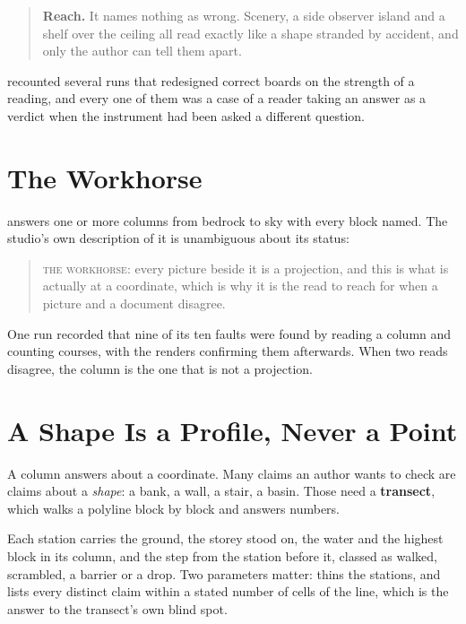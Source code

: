 \begin{quote}
\textbf{Reach.} It names nothing as wrong. Scenery, a side observer island and a
shelf over the ceiling all read exactly like a shape stranded by accident, and only
the author can tell them apart.
\end{quote}

 recounted several runs that redesigned correct boards on the
strength of a reading, and every one of them was a case of a reader taking an answer
as a verdict when the instrument had been asked a different question.

\section{The Workhorse}

 answers one or more columns from bedrock to sky
with every block named. The studio's own description of it is unambiguous about its
status:

\begin{quote}
\textsc{the workhorse}: every picture beside it is a projection, and this is what is
actually at a coordinate, which is why it is the read to reach for when a picture
and a document disagree.
\end{quote}

One run recorded that nine of its ten faults were found by reading a column and
counting courses, with the renders confirming them afterwards. When two reads
disagree, the column is the one that is not a projection.

\section{A Shape Is a Profile, Never a Point}

A column answers about a coordinate. Many claims an author wants to check are
claims about a \emph{shape}: a bank, a wall, a stair, a basin. Those need a
\textbf{transect}, which walks a polyline block by block and answers numbers.

Each station carries the ground, the storey stood on, the water and the highest
block in its column, and the step from the station before it, classed as walked,
scrambled, a barrier or a drop. Two parameters matter:  thins the
stations, and  lists every distinct claim within a stated number of cells
of the line, which is the answer to the transect's own blind spot.

